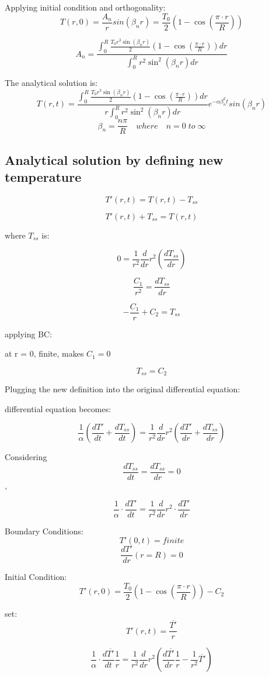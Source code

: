 \documentclass[12pt,letterpaper]{article}
\begin{document}
Applying initial condition and orthogonality:
\[T(r,0) = \frac{A_n}{r} sin(\beta_n r) = \frac{T_0}{2} (1-\cos{(\frac{\pi \cdot r}{R})}) \]

\[A_n = \frac{\int_{0}^{R} \frac{T_0 r^3 \sin(\beta_n r)}{2} (1-\cos{(\frac{\pi \cdot r}{R})}) dr}{\int_{0}^{R} r^2 \sin^{2}(\beta_n r) dr}\]

The analytical solution is:
\[T(r,t) = \frac{\int_{0}^{R} \frac{T_0 r^3 \sin(\beta_n r)}{2} (1-\cos{(\frac{\pi \cdot r}{R})}) dr}{r \int_{0}^{R} r^2 \sin^{2}(\beta_n r) dr} e^{-\alpha \beta_n^2 t} sin(\beta_n r)\]
\[\beta_n = \frac{n\pi}{R} \quad where \quad n = 0 \; to \; \infty \]




\subsection{Analytical solution by defining new temperature}

\[T'(r,t) = T(r,t) - T_{ss}\]

\[T'(r,t) + T_{ss} = T(r,t) \]


where $T_{ss}$ is:


\[0 = \frac{1}{r^2} \frac{d}{dr} r^2 (\frac{dT_{ss}}{dr})\]

\[\frac{C_1}{r^2} = \frac{dT_{ss}}{dr}\]

\[-\frac{C_1}{r} + C_2 = T_{ss}\]

applying BC:

at r = 0, finite, makes  $C_1 = 0$

\[T_{ss} = C_2\]

Plugging the new definition into the original differential equation:

differential equation becomes:

\[\frac{1}{\alpha} (\frac{dT'}{dt} + \frac{dT_{ss}}{dt}) = \frac{1}{r^2} \frac{d}{dr} r^2 (\frac{dT'}{dr} + \frac{dT_{ss}}{dr})\]

Considering \[\frac{dT_{ss}}{dt} = \frac{dT_{ss}}{dr} = 0\],

\[\frac{1}{\alpha} \cdot \frac{dT'}{dt} = \frac{1}{r^2} \frac{d}{dr} r^2 \cdot \frac{dT'}{dr} \]

Boundary Conditions:
\[T'(0,t)  = finite \]
\[\frac{dT'}{dr} (r = R) = 0 \]

Initial Condition:
\[T'(r,0) = \frac{T_0}{2} (1-\cos{(\frac{\pi \cdot r}{R})}) - C_2 \]

set:
\[T'(r,t) = \frac{\overline{T'}}{r} \]


\[\frac{1}{\alpha} \cdot \frac{d\overline{T'}}{dt} \frac{1}{r} = \frac{1}{r^2} \frac{d}{dr} r^2 (\frac{d\overline{T'}}{dr} \frac{1}{r} - \frac{1}{r^2} \overline{T'}) \]
\end{document}
